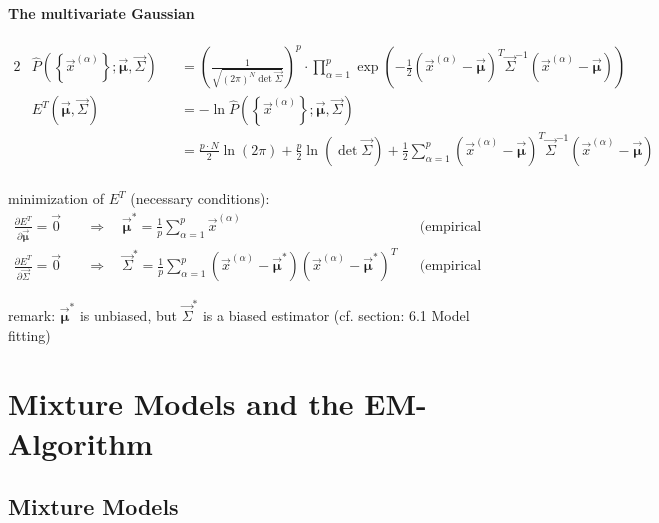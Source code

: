 \paragraph{The multivariate Gaussian}
\vspace{-0.8cm}
\begin{alignat*}{2}
&\widehat{P}\left(\left\{ \vec{x}^{(\alpha)} \right\}; \vec{\boldsymbol \mu}, \vec{\Sigma} \right) &&= \left( \frac{1}{\sqrt{(2\pi)^N \det \vec{\Sigma}}} \right)^p \cdot \prod_{\alpha=1}^{p} \exp \left(-\frac{1}{2} \left(\vec{x}^{(\alpha)} - \vec{\boldsymbol \mu} \right)^T \vec{\Sigma}^{-1} \left(\vec{x}^{(\alpha)} - \vec{\boldsymbol \mu} \right) \right) \\[10pt]
&E^T\left( \vec{\boldsymbol \mu}, \vec{\Sigma} \right) &&= - \ln \widehat{P}\left(\left\{ \vec{x}^{(\alpha)} \right\}; \vec{\boldsymbol \mu}, \vec{\Sigma} \right) \\
& &&= \frac{p \cdot N}{2} \ln(2\pi) + \frac{p}{2} \ln(\det \vec{\Sigma}) + \frac{1}{2} \sum_{\alpha=1}^{p} \left(  \vec{x}^{(\alpha)} - \vec{\boldsymbol \mu} \right)^T \vec{\Sigma}^{-1} \left(  \vec{x}^{(\alpha)} - \vec{\boldsymbol \mu} \right)
\end{alignat*}
\\\vspace{0.2cm}
minimization of $E^T$ (necessary conditions):
\vspace{-0.1cm}
\begin{align*}
\frac{\partial E^T}{\partial \vec{\boldsymbol \mu}} = \vec{0} \quad &\Rightarrow \quad \vec{\boldsymbol \mu}^* = \frac{1}{p} \sum_{\alpha=1}^{p} \vec{x}^{(\alpha)}  &&\text{(empirical average)}\\
\frac{\partial E^T}{\partial \vec{\Sigma}} = \vec{0} \quad &\Rightarrow \quad \vec{\Sigma}^* = \frac{1}{p} \sum_{\alpha=1}^{p} (\vec{x}^{(\alpha)} - \vec{\boldsymbol \mu}^*) (\vec{x}^{(\alpha)} - \vec{\boldsymbol \mu}^*)^T &&\text{(empirical covariance matrix)}
\end{align*}

remark: $\vec{\boldsymbol \mu}^*$ is unbiased, but $\vec{\Sigma}^*$ is a biased estimator (cf. section: 6.1 Model fitting)
\newpage
\section{Mixture Models and the EM-Algorithm}
\subsection{Mixture Models}
